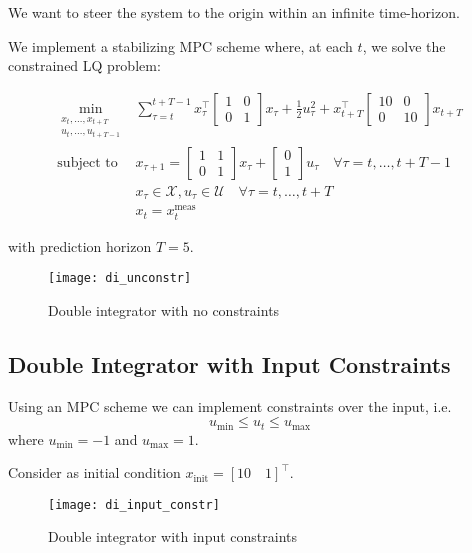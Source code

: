 \documentclass[openany]{book}
\theoremstyle{definition}
\theoremstyle{remark}
\begin{document}
We want to steer the system to the origin within an infinite time-horizon.

We implement a stabilizing MPC scheme where, at each $t$, we solve the constrained LQ problem:

\begin{align*}
\min_{\substack{x_t,\ldots,x_{t+T} \\ u_t,\ldots,u_{t+T-1}}} & \sum_{\tau=t}^{t+T-1} x_\tau^\top \begin{bmatrix} 1 & 0 \\ 0 & 1 \end{bmatrix} x_\tau + \frac{1}{2}u_\tau^2 
+ x_{t+T}^\top \begin{bmatrix} 10 & 0 \\ 0 & 10 \end{bmatrix} x_{t+T} \\
\text{subject to } & x_{\tau+1} = \begin{bmatrix} 1 & 1 \\ 0 & 1 \end{bmatrix} x_\tau + \begin{bmatrix} 0 \\ 1 \end{bmatrix} u_\tau \quad \forall\tau = t,\ldots,t+T-1 \\
& x_\tau \in \mathcal{X}, u_\tau \in \mathcal{U} \quad \forall\tau = t,\ldots,t+T \\
& x_t = x_t^{\text{meas}}
\end{align*}

with prediction horizon $T = 5$.

\begin{figure}[ht]
    \centering
    \texttt{[image: di\_unconstr]}
    \caption{Double integrator with no constraints}
    \label{fig:di_unconstr}
\end{figure}

\subsection{Double Integrator with Input Constraints}
Using an MPC scheme we can implement constraints over the input, i.e.
\[
u_{\min} \leq u_t \leq u_{\max}
\]
where $u_{\min} = -1$ and $u_{\max} = 1$.

Consider as initial condition $x_{\text{init}} = [10 \quad 1]^\top$.

\begin{figure}[ht]
    \centering
    \texttt{[image: di\_input\_constr]}
    \caption{Double integrator with input constraints}
    \label{fig:di_input_constr}
\end{figure}
\end{document}
